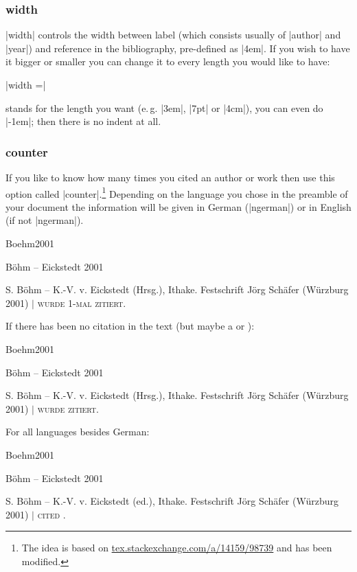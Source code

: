 \documentclass[a4paper,
10pt,
greek,
french,
spanish,
italian,
ngerman,
english
]{ltxdoc}
\begin{document}
 
\subsubsection{width}\label{width}
|width| controls the width between label (which consists usually of |author| and |year|) and reference in the bibliography, pre-defined as |4em|.
If you wish to have it bigger or smaller you can change it to every length you would like to have:

|width =| 

 stands for the length you want (e.\,g. |3em|, |7pt| or |4cm|), you can even do |-1em|; 
then there is no indent at all.

\subsubsection{counter}\label{counter}
If you like to know how many times you cited an author or work then use this option called |counter|.\footnote{The idea is based on \href{http://tex.stackexchange.com/a/14159/98739}{tex.stackexchange.com/a/14159/98739} and has been modified.} 
Depending on the language you chose in the preamble of your document the information will be given in German (|ngerman|) or in English (if not |ngerman|).

\begin{bibbsp}{Boehm2001}
\parbox[t]{3cm}{Böhm – Eickstedt 2001} \parbox[t]{8cm}{%
S. Böhm – K.-V. v. Eickstedt (Hrsg.), Ithake. Festschrift Jörg Schäfer (Würzburg 2001)  $\vert$  {\scshape  wurde 1-mal zitiert.}}
\end{bibbsp}

If there has been no citation in the text (but maybe a  or ):
\begin{bibbsp}{Boehm2001}
\parbox[t]{3cm}{Böhm – Eickstedt 2001} \parbox[t]{8cm}{%
S. Böhm – K.-V. v. Eickstedt (Hrsg.), Ithake. Festschrift Jörg Schäfer (Würzburg 2001)  $\vert$  {\scshape  wurde {\color{red}{keinmal}} zitiert.}}
\end{bibbsp} 

For all languages besides German:
\begin{bibbsp}{Boehm2001}
\parbox[t]{3cm}{Böhm – Eickstedt 2001} \parbox[t]{8cm}{%
S. Böhm – K.-V. v. Eickstedt (ed.), Ithake. Festschrift Jörg Schäfer (Würzburg 2001) $\vert$  {\scshape cited {{\color{red}{not once}}}.}}
\end{bibbsp}
  
\end{document}
